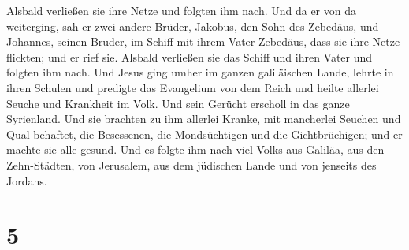  Alsbald verließen sie ihre Netze und folgten ihm nach.
 Und da er von da weiterging, sah er zwei andere Brüder,
Jakobus, den Sohn des Zebedäus, und Johannes, seinen Bruder, im Schiff
mit ihrem Vater Zebedäus, dass sie ihre Netze flickten; und er rief sie.
 Alsbald verließen sie das Schiff und ihren Vater und
folgten ihm nach.  Und Jesus ging umher im ganzen
galiläischen Lande, lehrte in ihren Schulen und predigte das Evangelium
von dem Reich und heilte allerlei Seuche und Krankheit im Volk.
 Und sein Gerücht erscholl in das ganze Syrienland. Und
sie brachten zu ihm allerlei Kranke, mit mancherlei Seuchen und Qual
behaftet, die Besessenen, die Mondsüchtigen und die Gichtbrüchigen; und
er machte sie alle gesund.  Und es folgte ihm nach viel
Volks aus Galiläa, aus den Zehn-Städten, von Jerusalem, aus dem
jüdischen Lande und von jenseits des Jordans.

\hypertarget{section-4}{%
\section{5}\label{section-4}}

